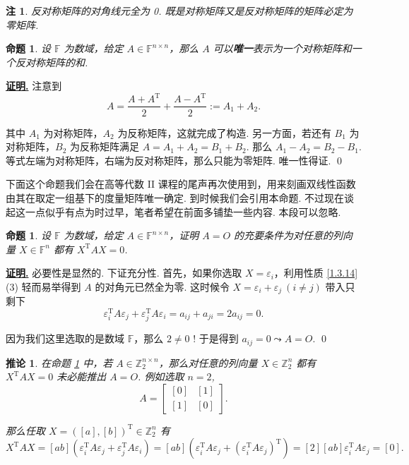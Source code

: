 \documentclass[10pt,openany]{article}
\theoremstyle{thmstyle} %
\theoremstyle{defstyle} %
\newtheorem{corollary}[theorem]{推论}
\theoremstyle{prostyle} %
\newtheorem{proposition}[theorem]{命题}
\theoremstyle{exastyle}
\theoremstyle{remstyle}
\newtheorem{remark}[theorem]{注}
\renewenvironment{proof}[1][证明]{\par\underline{\textbf{#1.}} \;\fangsong}{\qed\par}
\newcommand{\T}{^{\text{T}}}
\newcommand{\F}{\mathbb{F}}
\newcommand{\n}{^{n \times n}}
\begin{document}
\begin{remark}
	反对称矩阵的对角线元全为 0. 既是对称矩阵又是反对称矩阵的矩阵必定为零矩阵.
\end{remark}

\begin{proposition}	\label{1.3.26}
	设 \( \F \) 为数域，给定 \( A \in \F^{n \times n} \)，那么 \( A \) 可以\textbf{唯一}表示为一个对称矩阵和一个反对称矩阵的和.

\end{proposition}

\begin{proof}
	注意到
	\[ A=\frac{A+A\T}{2}+\frac{A-A\T}{2}:=A_1+A_2. \]
	
	其中 \( A_1 \) 为对称矩阵，\( A_2 \) 为反称矩阵，这就完成了构造. 另一方面，若还有 \( B_1 \) 为对称矩阵，\( B_2 \) 为反称矩阵满足 \( A=A_1+A_2=B_1+B_2 \). 那么 \( A_1-A_2=B_2-B_1 \). 等式左端为对称矩阵，右端为反对称矩阵，那么只能为零矩阵. 唯一性得证.
\end{proof}



下面这个命题我们会在高等代数 II 课程的尾声再次使用到，用来刻画双线性函数由其在取定一组基下的度量矩阵唯一确定. 到时候我们会引用本命题. 不过现在谈起这一点似乎有点为时过早，笔者希望在前面多铺垫一些内容. 本段可以忽略.

\begin{proposition}	\label{1.3.27}
	设 \( \F \) 为数域，给定 \( A \in \F\n \)，证明 \( A=O \) 的充要条件为对任意的列向量 \( X \in \F^n\) 都有 \( X\T AX=0 \).

\end{proposition} 

\begin{proof}
	必要性是显然的. 下证充分性. 首先，如果你选取 \( X=\varepsilon_i \)，利用性质 \ref{1.3.14} (3) 轻而易举得到 \( A \) 的对角元已然全为零. 这时候令 \( X=\varepsilon_i+\varepsilon_j \ (i \neq j) \) 带入只剩下 
	\[ \varepsilon_i\T A \varepsilon_j+\varepsilon_j\T A \varepsilon_i= a_{ij}+a_{ji}=2a_{ij}=0. \]
	
	因为我们这里选取的是数域 \( \mathbb{F} \)，那么 \( 2 \neq 0 \) ! 于是得到 \( a_{ij}=0 \leadsto A=O \).
\end{proof}

\begin{corollary}
	在命题 \ref{1.3.27} 中，若 \( A \in \mathbb{Z}_2^{n \times n} \)，那么对任意的列向量 \( X \in \mathbb{Z}_2^n\) 都有 \( X\T AX=0 \) 未必能推出 \( A=O \). 例如选取 \( n=2 \),
	\[ A=\begin{bmatrix}
		[0] & [1] \\ [1] & [0]
	\end{bmatrix}. \]
	
	那么任取 \( X=([a],[b])\T \in \mathbb{Z}_2^n \) 有
	\[ X\T AX=[ab](\varepsilon_i\T A \varepsilon_j+\varepsilon_j\T A \varepsilon_i)=[ab](\varepsilon_i\T A \varepsilon_j+(\varepsilon_i\T A \varepsilon_j)\T)=[2][ab]\varepsilon_i\T A \varepsilon_j=[0]. \]
\end{corollary}
\end{document}
